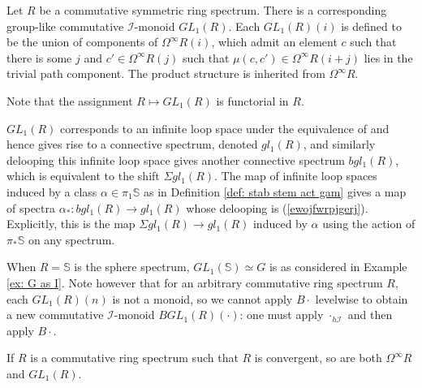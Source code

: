 \documentclass{TPmod}
\def\bS{\mathbb{S}}
\newcommand{\cI}{\mathcal{I}}
\numberwithin{equation}{section}
\begin{document}
    \begin{defn}\label{def: GL one}
        Let $R$ be a commutative symmetric ring spectrum. There is a corresponding group-like commutative $\cI$-monoid $GL_1(R)$. Each $GL_1(R)(i)$ is defined to be the union of components of $\Omega^\infty R(i)$, which admit an element $c$ such that there is some $j$ and $c' \in \Omega^\infty R(j)$ such that $\mu(c,c') \in \Omega^\infty R(i+j)$ lies in the trivial path component. The product structure is inherited from $\Omega^\infty R$.
    \end{defn}
    Note that the assignment $R \mapsto GL_1(R)$ is functorial in $R$.
    \begin{rmk}\label{rmk:A}
        $GL_1(R)$ corresponds to an infinite loop space under the equivalence of \cite{Sagave-Schlichtkrull:Diagram} and hence gives rise to a connective spectrum, denoted $gl_1(R)$, and similarly delooping this infinite loop space gives another connective spectrum $bgl_1(R)$, which is equivalent to the shift $\Sigma gl_1(R)$. The map of infinite loop spaces induced by a class $\alpha \in \pi_1 \bS$ as in Definition \ref{def: stab stem act gam} gives a map of spectra $\alpha_*: bgl_1(R) \to gl_1(R)$ whose delooping is (\ref{ewojfwrpjgerj}). Explicitly, this is the map $\Sigma gl_1(R) \to gl_1(R)$ induced by $\alpha$ using the action of $\pi_*\bS$ on any spectrum.
    \end{rmk}
    \begin{ex}
        When $R=\bS$ is the sphere spectrum, $GL_1(\bS) \simeq G$ is as considered in Example \ref{ex: G as I}. Note however that for an arbitrary commutative ring spectrum $R$, each $GL_1(R)(n)$ is not a monoid, so we cannot apply $B\cdot$ levelwise to obtain a new commutative $\cI$-monoid $BGL_1(R)(\cdot)$: one must apply $\cdot_{h\cI}$ and then apply $B\cdot$.
    \end{ex}
    \begin{rmk}
        If $R$ is a commutative ring spectrum such that $R$ is convergent, so are both $\Omega^\infty R$ and $GL_1(R)$.
    \end{rmk}
\end{document}
